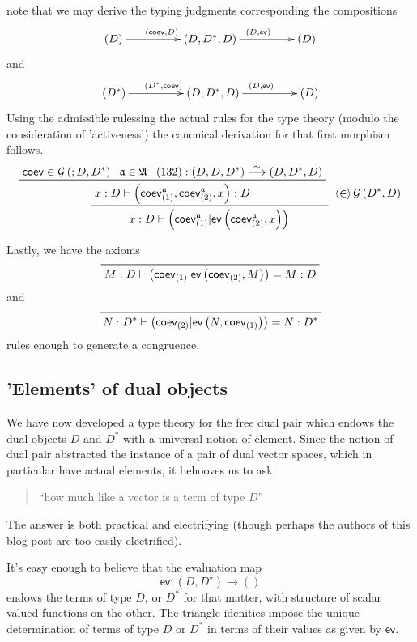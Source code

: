 \documentclass[pra,floatfix,
amsmath,superscriptaddress, 12pt]{article}
\theoremstyle{definition}
\newcommand{\liso}{\overset{\sim}{\longrightarrow}}
\newcommand{\evmap}{\mathsf{ev}}
\newcommand{\coev}{\mathsf{coev}}
\begin{document}
note that we may derive the typing judgments corresponding the compositions
\[
\xymatrixcolsep{4pc}\xymatrix{\left(D\right)\ar[r]^{\left(\coev,D\right)} & \left(D,D^{*},D\right)\ar[r]^{\left(D,\evmap\right)} & \left(D\right)}
\]
and 
\[
\xymatrixcolsep{4pc}\xymatrix{\left(D^{*}\right)\ar[r]^{\left(D^{*},\coev\right)} & \left(D,D^{*},D\right)\ar[r]^{\left(D,\evmap\right)} & \left(D\right)}
\]
Using the admissible rulessing the actual rules for the type theory
(modulo the consideration of 'activeness') the canonical derivation
for that first morphism follows.
\[
\prftree{\prftree{\coev\in\mathcal{G}\left(;D,D^{*}\right)}{\mathfrak{a}\in\mathfrak{A}}{\left(132\right):\left(D,D,D^{*}\right)\liso\left(D,D^{*},D\right)}{x:D\vdash\left(\coev_{\left(1\right)}^{\mathfrak{a}},\coev_{\left(2\right)}^{\mathfrak{a}},x\right):D}}{\ev\in\mathcal{G}\left(D^{*},D\right)}{x:D\vdash\left(\coev_{\left(1\right)}^{\mathfrak{a}}|\evmap\left(\coev_{\left(2\right)}^{\mathfrak{a}},x\right)\right)}
\]

Lastly, we have the axioms 
\[
\prftree{}{M:D\vdash\left(\coev_{\left(1\right)}|\evmap\left(\coev_{\left(2\right)},M\right)\right)=M:D}
\]
and 
\[
\prftree{}{N:D^{*}\vdash\left(\coev_{\left(2\right)}|\evmap\left(N,\coev_{\left(1\right)}\right)\right)=N:D^{*}}
\]
rules enough to generate a congruence.

\subsection{'Elements' of dual objects}
We have now developed a type theory for the free dual pair which endows
the dual objects $D$ and $D^{*}$ with a universal notion of element.
Since the notion of dual pair abstracted the instance of a pair of
dual vector spaces, which in particular have actual elements, it behooves
us to ask:
\begin{quotation}
``how much like a vector is a term of type $D$''
\end{quotation}
The answer is both practical and electrifying (though perhaps the
authors of this blog post are too easily electrified).

\par

It's easy enough to believe that the evaluation map 
\[
\evmap:\left(D,D^{\star}\right)\longrightarrow\left(\right)
\]
 endows the terms of type $D$, or $D^{*}$ for that matter, with
structure of scalar valued functions on the other. The triangle idenities impose the unique determination of terms of type $D$ or $D^*$ in terms of their values as given by $\evmap$.
\end{document}
